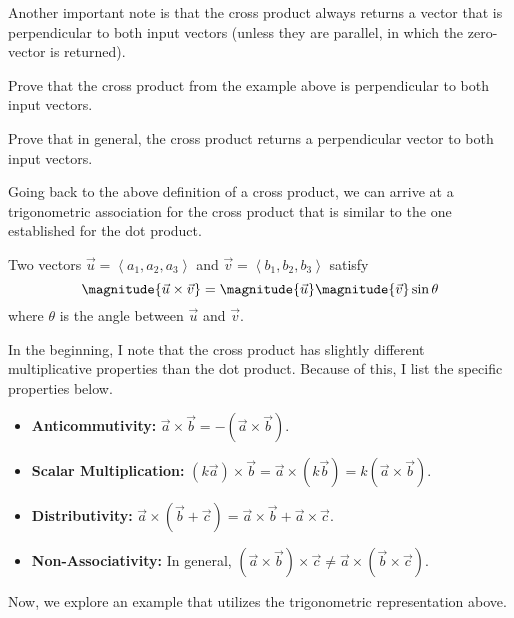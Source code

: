 \documentclass[12pt]{scrartcl}
\begin{document}
\begin{remark}
    Another important note is that the cross product always returns a vector that is perpendicular to both input vectors (unless they are parallel, in which the zero-vector is returned).
\end{remark}

\begin{exercise}
    Prove that the cross product from the example above is perpendicular to both input vectors.
\end{exercise}

\begin{exercise}
    Prove that in general, the cross product returns a perpendicular vector to both input vectors.
\end{exercise}

Going back to the above definition of a cross product, we can arrive at a trigonometric association for the cross product that is similar to the one established for the dot product.

\begin{proposition}
    Two vectors $\vec{u} = \left<a_{1}, a_{2}, a_{3}\right>$ and $\vec{v} = \left<b_{1}, b_{2}, b_{3}\right>$ satisfy
    \[\magnitude{\vec{u} \times \vec{v}} = \magnitude{\vec{u}} \magnitude{\vec{v}} \sin\theta\]
    where $\theta$ is the angle between $\vec{u}$ and $\vec{v}$.
\end{proposition}

In the beginning, I note that the cross product has slightly different multiplicative properties than the dot product. Because of this, I list the specific properties below.

\begin{itemize}
    \item \textbf{Anticommutivity:} $\vec{a} \times \vec{b} = -(\vec{a} \times \vec{b})$.
    \item \textbf{Scalar Multiplication:} $(k\vec{a}) \times \vec{b} = \vec{a} \times (k\vec{b}) = k(\vec{a} \times \vec{b})$.
    \item \textbf{Distributivity:} $\vec{a} \times (\vec{b} + \vec{c}) = \vec{a} \times \vec{b} + \vec{a} \times \vec{c}$.
    \item \textbf{Non-Associativity:} In general, $(\vec{a} \times \vec{b}) \times \vec{c} \neq \vec{a} \times (\vec{b} \times \vec{c})$.
\end{itemize}

Now, we explore an example that utilizes the trigonometric representation above.
\end{document}
